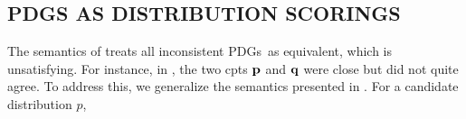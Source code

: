 \documentclass{article}
\newcommand{\V}{\mathcal V}
\newcommand{\MN}{PDG}
\newcommand{\MNs}{\MN s}
\numberwithin{equation}{section}
\begin{document}
       	\subsection{PDGS AS DISTRIBUTION SCORINGS} \label{sec:weighted-semantics} 

        
        The semantics of  treats all inconsistent \MNs\ as equivalent, which is unsatisfying. 
		For instance, in , the two cpts $\bf p$ and $\bf q$ were close but did not quite agree.
 		To address this, we generalize the semantics presented in . For a candidate distribution $p$,
\end{document}
